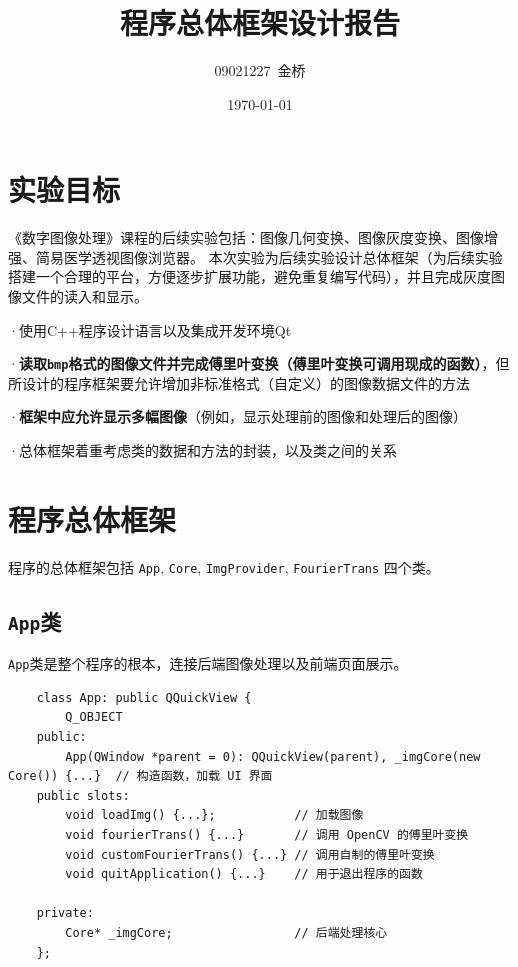 \documentclass{article}
\title{程序总体框架设计报告}
\author{09021227~金桥}
\date{\today}
\begin{document}
\maketitle

\section{实验目标}

《数字图像处理》课程的后续实验包括：图像几何变换、图像灰度变换、图像增强、简易医学透视图像浏览器。
本次实验为后续实验设计总体框架（为后续实验搭建一个合理的平台，方便逐步扩展功能，避免重复编写代码），并且完成灰度图像文件的读入和显示。

·使用C++程序设计语言以及集成开发环境Qt

·\textbf{读取\texttt{bmp}格式的图像文件并完成傅里叶变换（傅里叶变换可调用现成的函数）}，但所设计的程序框架要允许增加非标准格式（自定义）的图像数据文件的方法

·\textbf{框架中应允许显示多幅图像}（例如，显示处理前的图像和处理后的图像）

·总体框架着重考虑类的数据和方法的封装，以及类之间的关系

\section{程序总体框架}

程序的总体框架包括 \texttt{App}, \texttt{Core}, \texttt{ImgProvider}, \texttt{FourierTrans} 四个类。

\subsection{\texttt{App}类}

\texttt{App}类是整个程序的根本，连接后端图像处理以及前端页面展示。

\begin{lstlisting}
    class App: public QQuickView {
        Q_OBJECT
    public:
        App(QWindow *parent = 0): QQuickView(parent), _imgCore(new Core()) {...}  // 构造函数，加载 UI 界面
    public slots:
        void loadImg() {...};           // 加载图像
        void fourierTrans() {...}       // 调用 OpenCV 的傅里叶变换
        void customFourierTrans() {...} // 调用自制的傅里叶变换
        void quitApplication() {...}    // 用于退出程序的函数

    private:
        Core* _imgCore;                 // 后端处理核心
    };
\end{lstlisting}
\end{document}
